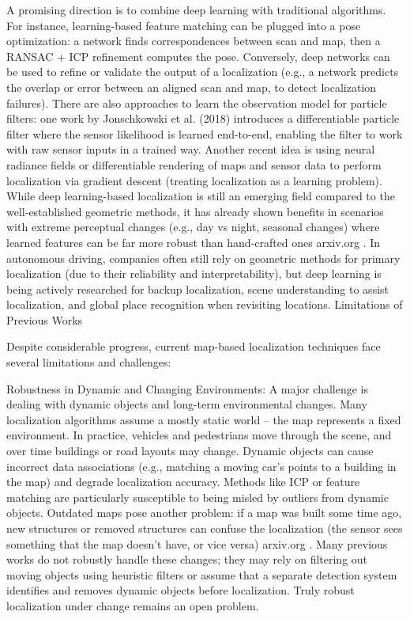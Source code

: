 A promising direction is to combine deep learning with traditional algorithms. For instance, learning-based feature matching can be plugged into a pose optimization: a network finds correspondences between scan and map, then a RANSAC + ICP refinement computes the pose. Conversely, deep networks can be used to refine or validate the output of a localization (e.g., a network predicts the overlap or error between an aligned scan and map, to detect localization failures). There are also approaches to learn the observation model for particle filters: one work by Jonschkowski et al. (2018) introduces a differentiable particle filter where the sensor likelihood is learned end-to-end, enabling the filter to work with raw sensor inputs in a trained way. Another recent idea is using neural radiance fields or differentiable rendering of maps and sensor data to perform localization via gradient descent (treating localization as a learning problem). While deep learning-based localization is still an emerging field compared to the well-established geometric methods, it has already shown benefits in scenarios with extreme perceptual changes (e.g., day vs night, seasonal changes) where learned features can be far more robust than hand-crafted ones​
arxiv.org
. In autonomous driving, companies often still rely on geometric methods for primary localization (due to their reliability and interpretability), but deep learning is being actively researched for backup localization, scene understanding to assist localization, and global place recognition when revisiting locations.
Limitations of Previous Works

Despite considerable progress, current map-based localization techniques face several limitations and challenges:

    Robustness in Dynamic and Changing Environments: A major challenge is dealing with dynamic objects and long-term environmental changes. Many localization algorithms assume a mostly static world – the map represents a fixed environment. In practice, vehicles and pedestrians move through the scene, and over time buildings or road layouts may change. Dynamic objects can cause incorrect data associations (e.g., matching a moving car’s points to a building in the map) and degrade localization accuracy. Methods like ICP or feature matching are particularly susceptible to being misled by outliers from dynamic objects. Outdated maps pose another problem: if a map was built some time ago, new structures or removed structures can confuse the localization (the sensor sees something that the map doesn’t have, or vice versa)​
    arxiv.org
    . Many previous works do not robustly handle these changes; they may rely on filtering out moving objects using heuristic filters or assume that a separate detection system identifies and removes dynamic objects before localization. Truly robust localization under change remains an open problem.

